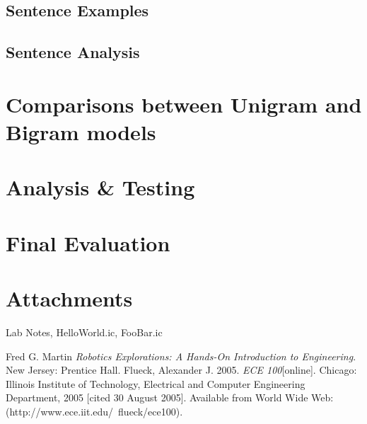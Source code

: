 \documentclass[a4paper, 11pt]{article}
\begin{document}
\subsection*{Sentence Examples}
\subsection*{Sentence Analysis}

\section*{Comparisons between Unigram and Bigram models}
\lipsum[5]

\section*{Analysis \& Testing}
\lipsum[6]

\section*{Final Evaluation}
\lipsum[7]

\section*{Attachments}
Lab Notes, HelloWorld.ic, FooBar.ic

\begin{thebibliography}{9}
 Fred G. Martin \emph{Robotics Explorations: A Hands-On Introduction to Engineering}. New Jersey: Prentice Hall.
  Flueck, Alexander J. 2005. \emph{ECE 100}[online]. Chicago: Illinois Institute of Technology, Electrical and Computer Engineering Department, 2005 [cited 30
August 2005]. Available from World Wide Web: (http://www.ece.iit.edu/~flueck/ece100).
\end{thebibliography}
\end{document}

